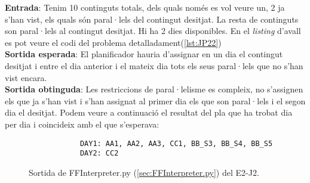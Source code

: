 \documentclass[a4paper]{article}
\begin{document}
	\noindent \textbf{Entrada}: Tenim 10 continguts totals, dels quals només es vol veure un, 2 ja s'han vist, els quals són paral·lels del contingut desitjat. La resta de continguts son paral·lels al contingut desitjat. Hi ha 2 dies disponibles. En el \textit{listing} d'avall es pot veure el codi del problema detalladament(\ref{lst:JP22})\\
	
	\noindent \textbf{Sortida esperada}: El planificador hauria d'assignar en un dia el contingut desitjat i entre el dia anterior i el mateix dia tots els seus paral·lels que no s'han vist encara. \\
	
	\noindent \textbf{Sortida obtinguda}: Les restriccions de paral·lelisme es compleix, no s'assignen els que ja s'han vist i s'han assignat al primer dia els que son paral·lels i el segon dia el desitjat. Podem veure a continuació el resultat del pla que ha trobat dia per dia i coincideix amb el que s'esperava:
	
	\begin{figure}[H]
		\centering
		\begin{verbatim}
			DAY1: AA1, AA2, AA3, CC1, BB_S3, BB_S4, BB_S5
			DAY2: CC2
		\end{verbatim}
		\caption{Sortida de FFInterpreter.py (\ref{sec:FFInterpreter.py}) del E2-J2.}
	\end{figure}
	
\end{document}
